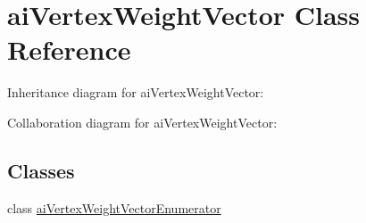 \hypertarget{classai_vertex_weight_vector}{\section{ai\+Vertex\+Weight\+Vector Class Reference}
\label{classai_vertex_weight_vector}
}


Inheritance diagram for ai\+Vertex\+Weight\+Vector\+:


Collaboration diagram for ai\+Vertex\+Weight\+Vector\+:
\subsection*{Classes}
\begin{DoxyCompactItemize}
\item 
class \hyperlink{classai_vertex_weight_vector_1_1ai_vertex_weight_vector_enumerator}{ai\+Vertex\+Weight\+Vector\+Enumerator}
\end{DoxyCompactItemize}
